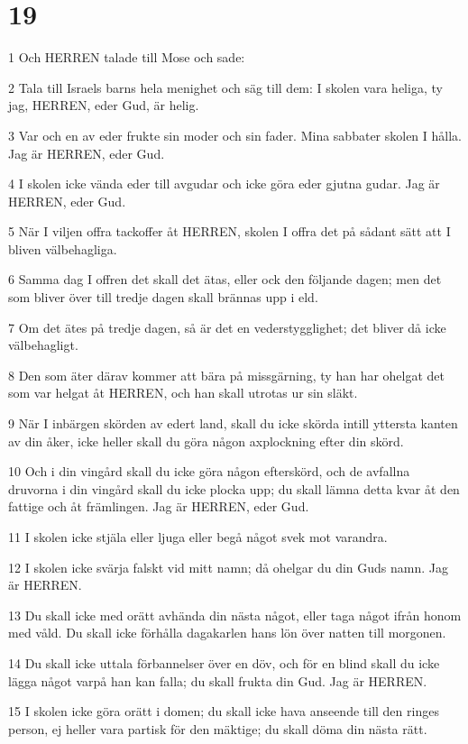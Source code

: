 \chapter{19}

\par 1 Och HERREN talade till Mose och sade:
\par 2 Tala till Israels barns hela menighet och säg till dem: I skolen vara heliga, ty jag, HERREN, eder Gud, är helig.
\par 3 Var och en av eder frukte sin moder och sin fader. Mina sabbater skolen I hålla. Jag är HERREN, eder Gud.
\par 4 I skolen icke vända eder till avgudar och icke göra eder gjutna gudar. Jag är HERREN, eder Gud.
\par 5 När I viljen offra tackoffer åt HERREN, skolen I offra det på sådant sätt att I bliven välbehagliga.
\par 6 Samma dag I offren det skall det ätas, eller ock den följande dagen; men det som bliver över till tredje dagen skall brännas upp i eld.
\par 7 Om det ätes på tredje dagen, så är det en vederstygglighet; det bliver då icke välbehagligt.
\par 8 Den som äter därav kommer att bära på missgärning, ty han har ohelgat det som var helgat åt HERREN, och han skall utrotas ur sin släkt.
\par 9 När I inbärgen skörden av edert land, skall du icke skörda intill yttersta kanten av din åker, icke heller skall du göra någon axplockning efter din skörd.
\par 10 Och i din vingård skall du icke göra någon efterskörd, och de avfallna druvorna i din vingård skall du icke plocka upp; du skall lämna detta kvar åt den fattige och åt främlingen. Jag är HERREN, eder Gud.
\par 11 I skolen icke stjäla eller ljuga eller begå något svek mot varandra.
\par 12 I skolen icke svärja falskt vid mitt namn; då ohelgar du din Guds namn. Jag är HERREN.
\par 13 Du skall icke med orätt avhända din nästa något, eller taga något ifrån honom med våld. Du skall icke förhålla dagakarlen hans lön över natten till morgonen.
\par 14 Du skall icke uttala förbannelser över en döv, och för en blind skall du icke lägga något varpå han kan falla; du skall frukta din Gud. Jag är HERREN.
\par 15 I skolen icke göra orätt i domen; du skall icke hava anseende till den ringes person, ej heller vara partisk för den mäktige; du skall döma din nästa rätt.

